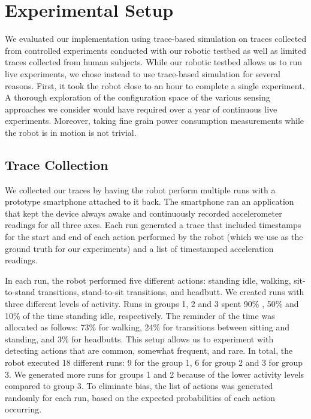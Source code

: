 \section{Experimental Setup}
\label{sec:experimentalSetup}

We evaluated our implementation using trace-based simulation on traces
collected from controlled experiments conducted with our robotic
testbed as well as limited traces collected from human subjects.
While our robotic testbed allows us to run live experiments, we chose
instead to use trace-based simulation for several reasons.  First, it
took the robot close to an hour to complete a single experiment.  A
thorough exploration of the configuration space of the various sensing
approaches we consider would have required over a year of continuous
live experiments.  Moreover, taking fine grain power consumption
measurements while the robot is in motion is not trivial.

\subsection{Trace Collection}

We collected our traces by having the robot perform multiple runs with
a prototype smartphone attached to it back.  The smartphone ran an
application that kept the device always awake and continuously recorded
accelerometer readings for all three axes.  Each run generated a
trace that included timestamps for the start and end of each action
performed by the robot (which we use as the ground truth for our
experiments) and a list of timestamped acceleration readings.

In each run, the robot performed five different actions: standing
idle, walking, sit-to-stand transitions, stand-to-sit transitions, and
headbutt.  We created runs with three different levels of activity.
Runs in groups 1, 2 and 3 spent 90\% , 50\% and 10\% of the time
standing idle, respectively. The reminder of the time was allocated as
follows: 73\% for walking, 24\% for transitions between sitting and
standing, and 3\% for headbutts.  This setup allows us to experiment
with detecting actions that are common, somewhat frequent, and rare.
In total, the robot executed 18 different runs: 9 for the group 1, 6
for group 2 and 3 for group 3.  We generated more runs for groups 1
and 2 because of the lower activity levels compared to group 3. To
eliminate bias, the list of actions was generated randomly for each
run, based on the expected probabilities of each action occurring.

